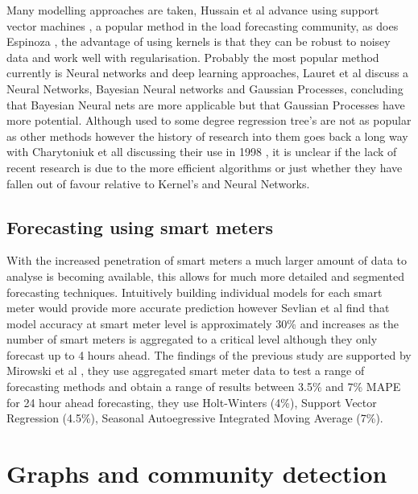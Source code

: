 Many modelling approaches are taken, Hussain et al advance using support vector machines \cite{Hussain2014}, a popular method in the load forecasting community, as does Espinoza \cite{Espinoza2007}, the advantage of using kernels is that they can be robust to noisey data and work well with regularisation. Probably the most popular method currently is Neural networks and deep learning approaches, Lauret et al \cite{Lauret2012} discuss a Neural Networks, Bayesian Neural networks and Gaussian Processes, concluding that Bayesian Neural nets are more applicable but that Gaussian Processes have more potential. Although used to some degree regression tree's are not as popular as other methods however the history of research into them goes back a long way with Charytoniuk et all discussing their use in 1998 \cite{Charytoniuk1998}, it is unclear if the lack of recent research is due to the more efficient algorithms or just whether they have fallen out of favour relative to Kernel's and Neural Networks. 

\subsection{Forecasting using smart meters}
\label{sec:forcesmart}
With the increased penetration of smart meters a much larger amount of data to analyse is becoming available, this allows for much more detailed and segmented forecasting techniques. Intuitively building individual models for each smart meter would provide more accurate prediction however Sevlian et al \cite{kavousian2013} find that model accuracy at smart meter level is approximately 30\% and increases as the number of smart meters is aggregated to a critical level although they only forecast up to 4 hours ahead. The findings of the previous study are supported by Mirowski et al \cite{mirowski2014}, they use aggregated smart meter data to test a range of forecasting methods and obtain a range of results between 3.5\% and 7\% MAPE for 24 hour ahead forecasting, they use Holt-Winters (4\%), Support Vector Regression (4.5\%), Seasonal Autoegressive Integrated Moving Average (7\%).

\section{Graphs and community detection}
\label{sec:commdetect}

